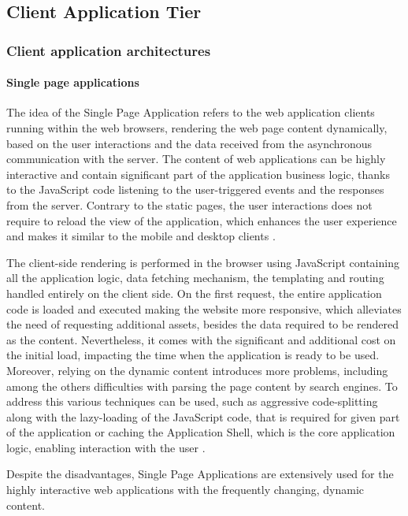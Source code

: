 \subsection{Client Application Tier}

\subsubsection{Client application architectures}

\paragraph*{Single page applications}

The idea of the Single Page Application refers to the web application clients running within the web browsers, rendering the web page content dynamically, based on the user interactions and the data received from the asynchronous communication with the server. The content of web applications can be highly interactive and contain significant part of the application business logic, thanks to the JavaScript code listening to the user-triggered events and the responses from the server.
Contrary to the static pages, the user interactions does not require to reload the view of the application, which enhances the user experience and makes it similar to the mobile and desktop clients \cite{PerspectivesOnArchitectureEvolution}.

The client-side rendering is performed in the browser using JavaScript containing all the application logic, data fetching mechanism, the templating and routing handled entirely on the client side. On the first request, the entire application code is loaded and executed making the website more responsive, which alleviates the need of requesting additional assets, besides the data required to be rendered as the content. Nevertheless, it comes with the significant and additional cost on the initial load, impacting the time when the application is ready to be used. Moreover, relying on the dynamic content introduces more problems, including among the others difficulties with parsing the page content by search engines. To address this various techniques can be used, such as aggressive code-splitting along with the lazy-loading of the JavaScript code, that is required for given part of the application or caching the Application Shell, which is the core application logic, enabling interaction with the user \cite{GoogleRenderingOnTheWeb}.

Despite the disadvantages, Single Page Applications are extensively used for the highly interactive web applications with the frequently changing, dynamic content.

